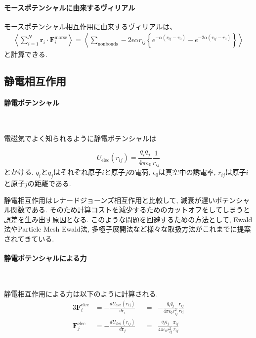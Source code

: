 \paragraph{モースポテンシャルに由来するヴィリアル}
モースポテンシャル相互作用に由来するヴィリアルは、
\begin{align}
   \left\langle
        \sum_{i=1}^{N} \bm{r}_{i} \cdot \bm{F}_{i}^{\mathrm{morse}}
   \right\rangle
 =
   \left\langle
        \sum_{\mathrm{nonbonds}}
        -2\epsilon \alpha r_{ij}
        \left\{
           e^{-\alpha(r_{ij} - r_{0})}
           -
           e^{-2\alpha(r_{ij} - r_{0})}
        \right\}
   \right\rangle
\end{align}
と計算できる.

\clearpage

\subsection{静電相互作用}
\paragraph{静電ポテンシャル} \

電磁気でよく知られるように静電ポテンシャルは

\begin{equation}
U_{\mathrm{elec}}(r_{ij}) = \frac{q_{i}q_{j}}{4 \pi \epsilon_{0}}
                            \frac{1}{r_{ij}}
\end{equation}
とかける.
$q_{i}$と$q_{j}$はそれぞれ原子$i$と原子$j$の電荷, $\epsilon_{0}$は真空中の誘電率, 
$r_{ij}$は原子$i$と原子$j$の距離である.

静電相互作用はレナードジョーンズ相互作用と比較して, 減衰が遅いポテンシャル関数である.
そのため計算コストを減少するためのカットオフをしてしまうと誤差を生み出す原因となる.
このような問題を回避するための方法として, Ewald法やParticle Mesh Ewald法,
多極子展開法など様々な取扱方法がこれまでに提案されてきている\cite{2014Cisneros}.

\paragraph{静電ポテンシャルによる力} \

静電相互作用による力は以下のように計算される.
\begin{alignat}{3}
   \bm{F}_{i}^{\mathrm{elec}}
 &=
   -\frac{d U_{\mathrm{elec}}(r_{ij})}{d \bm{r}_{i}}
&&=&
   -\frac{q_{i}q_{j}}{4 \pi \epsilon_{0} r_{ij}^{2}}
    \frac{\bm{r}_{ij}}{r_{ij}}
 \\
    \bm{F}_{j}^{\mathrm{elec}}
 &=
   -\frac{d U_{\mathrm{elec}}(r_{ij})}{d \bm{r}_{j}}
&&=&
    \frac{q_{i}q_{j}}{4 \pi \epsilon_{0} r_{ij}^{2}}
    \frac{\bm{r}_{ij}}{r_{ij}}
 \\
\end{alignat}


